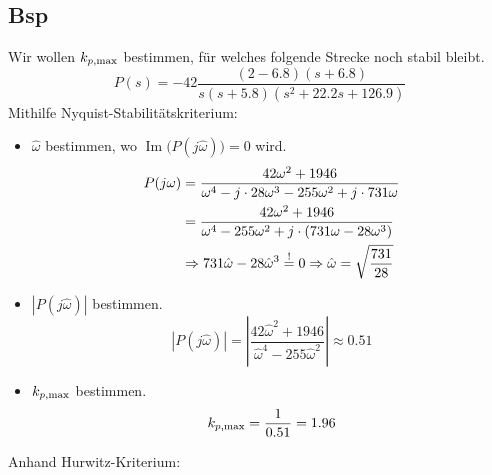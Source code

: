 \subsection{Bsp}
    Wir wollen $k_{p,\textnormal{max}}$ bestimmen, für welches folgende Strecke noch stabil bleibt.
    \begin{equation*}
        P(s) = -42\frac{(2-6.8)(s+6.8)}{s(s+5.8)(s^2+22.2s+126.9)}
    \end{equation*}
    Mithilfe Nyquist-Stabilitätskriterium:
    \begin{itemize}
        \item $\hat{\omega}$ bestimmen, wo $\operatorname{Im}\big(P(j\hat{\omega})\big)=0$      wird.
            \begin{align*}
                P(j\omega)  &= \frac{42\omega^2+1946}{\omega^4-j\cdot28\omega^3-255\omega^2+j\cdot731\omega}\\
                &= \frac{42\omega^2+1946}{\omega^4-255\omega^2+j\cdot(731\omega-28\omega^3)}\\
                &\Rightarrow 731\hat{\omega}-28\hat{\omega}^3 \overset{!}{=} 0 \Rightarrow \hat{\omega} = \sqrt{\frac{731}{28}}
            \end{align*}
        
        \item $|P(j\hat{\omega})|$ bestimmen.
            \begin{equation*}
                |P(j\hat{\omega})| = \left|\frac{42\hat{\omega}^2 + 1946}{\hat{\omega}^4-255\hat{\omega}^2}\right| \approx 0.51
            \end{equation*}
        
        \item $k_{p,\textnormal{max}}$ bestimmen.
            \begin{equation*}
                k_{p,\textnormal{max}} = \frac{1}{0.51} = 1.96
            \end{equation*}
    \end{itemize}
    Anhand Hurwitz-Kriterium:
